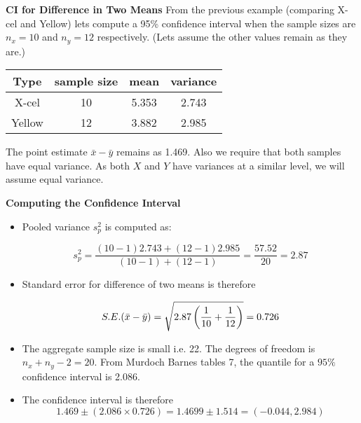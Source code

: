 \documentclass[a4paper,12pt]{article}
\begin{document}

\noindent \textbf{CI for Difference in Two Means}
From the previous example (comparing X-cel and Yellow) lets compute a 95\% confidence interval when the sample sizes are $n_x=10$ and $n_y=12$ respectively. (Lets assume the other values remain as they are.)
\begin{center}
	\begin{tabular}{|c|c|c|c|}
		\hline
		Type & sample size & mean & variance \\ \hline
		X-cel & 10 & 5.353 & 2.743 \\ \hline
		Yellow & 12 & 3.882 & 2.985 \\ \hline
	\end{tabular}
\end{center}
The point estimate $\bar{x} - \bar{y}$ remains as 1.469. Also we require that both samples have equal variance. As both $X$ and $Y$ have variances at a similar level, we will assume equal variance.




\noindent \textbf{Computing the Confidence Interval}
\begin{itemize} \item Pooled variance $s^2_p$ is computed as:
	
	\[ s^2_p = \frac{(10-1)2.743 + (12-1)2.985}{(10-1) + (12-1)}  = \frac{57.52}{20} = 2.87\]
	
	\item Standard error for difference of two means is therefore
	
	\[ S.E.(\bar{x}-\bar{y}) = \sqrt{  2.87 \left({1\over 10}+{1\over 12} \right)} = 0.726 \]
	
	\item The aggregate sample size is small i.e. 22. The degrees of freedom is $n_x+n_y-2 = 20$.
	From Murdoch Barnes tables 7, the quantile for a $95\%$ confidence interval is 2.086.
	
	\item The confidence interval is therefore
	\[ 1.469  \pm (2.086 \times 0.726) = 1.4699 \pm 1.514 =  (-0.044, 2.984 )  \]
\end{itemize}
\end{document}
